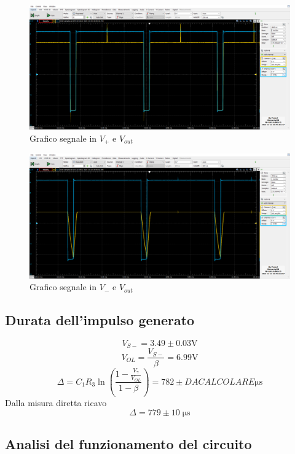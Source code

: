 \documentclass[10pt,a4paper]{article}
\begin{document}
\begin{figure}[htbp]
\centering
\includegraphics[scale=0.42]{monostabileV+}
\caption{Grafico segnale in $V_{+}$ e $V_{out}$}
\end{figure}

\begin{figure}[htbp]
\centering
\includegraphics[scale=0.42]{monostabileV-}
\caption{Grafico segnale in $V_{-}$ e $V_{out}$}
\end{figure}

\subsection{Durata dell'impulso generato}
\[
V_{S-}= 3.49 \pm 0.03 \si{\V}
\]
\[
V_{OL}=\frac{V_{S-}}{\beta}=6.99 \si{\V}
\]
\[
\Delta= C_1 R_3 \ln(\frac{1-\frac{V_{\gamma}}{V_{OL}}}{1-\beta})= 782 \pm D A   C A L C O L A R E \si{\micro\s}
\]
Dalla misura diretta ricavo
\[
\Delta= 779 \pm 10 \;\si{\micro\s}
\]

\subsection{Analisi del funzionamento del circuito}
\end{document}

